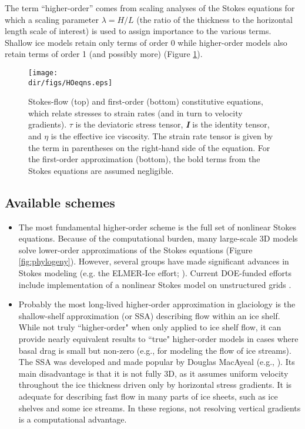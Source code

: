 The term ``higher-order'' comes from scaling analyses of the Stokes equations for which a scaling parameter $\lambda=H/L$ (the ratio of the thickness to the horizontal length scale of interest) is used to assign importance to the various terms. Shallow ice models retain only terms of order 0 while higher-order models also retain terms of order 1 (and possibly more) (Figure \ref{fig:hoeqns}). 

\begin{figure}
  \begin{center}
    \texttt{[image: \\dir/figs/HOeqns.eps]}
   \end{center}
  \caption{Stokes-flow (top) and first-order (bottom) constitutive equations, which relate stresses to strain rates (and in turn to velocity gradients). \textbf{$\tau$} is the deviatoric stress tensor, \textit{\textbf{I}} is the identity tensor, and $\eta$ is the effective ice viscosity. The strain rate tensor is given by the term in parentheses on the right-hand side of the equation. For the first-order approximation (bottom), the bold terms from the Stokes equations are assumed negligible.}
  \label{fig:hoeqns}
\end{figure} 

\subsection{Available schemes}

\begin{itemize}
\item The most fundamental higher-order scheme is the full set of nonlinear Stokes equations. Because of the computational burden, many large-scale 3D models solve lower-order approximations of the Stokes equations (Figure \ref{fig:phylogeny}). However, several groups have made significant advances in Stokes modeling
(e.g. the ELMER-Ice effort; \citet{gagliardini:2013iv}). 
Current DOE-funded efforts include implementation of a nonlinear Stokes model on unstructured grids \citep{Leng:2012ia}.
\end{itemize}

\begin{itemize}
\item 
Probably the most long-lived higher-order approximation in glaciology is the shallow-shelf approximation (or SSA) describing flow within an ice shelf. While not truly ``higher-order" when only applied to ice shelf flow, it can provide nearly equivalent results to ``true" higher-order models in cases where basal drag is small but non-zero (e.g., for modeling the flow of ice streams). The SSA was developed and made popular by Douglas MacAyeal (e.g., \citet{Macayeal:1989uo}). 
Its main disadvantage is that it is not fully 3D, as it assumes uniform velocity throughout the ice thickness driven only by horizontal stress gradients. It is adequate for describing fast flow in many parts of ice sheets, such as ice shelves and some ice streams. In these regions, not resolving vertical gradients is a computational advantage.   
\end{itemize}

